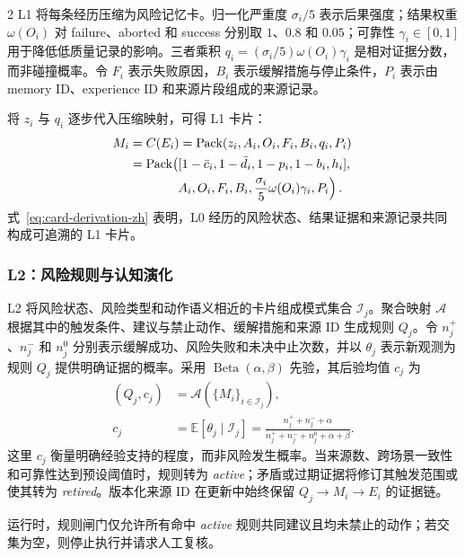 \documentclass[10pt]{article}
\begin{document}
\begin{multicols}{2}
L1 将每条经历压缩为风险记忆卡。归一化严重度 $\sigma_i/5$ 表示后果强度；结果权重 $\omega(O_i)$ 对 failure、aborted 和 success 分别取 $1$、$0.8$ 和 $0.05$；可靠性 $\gamma_i\in[0,1]$ 用于降低低质量记录的影响。三者乘积 $q_i=(\sigma_i/5)\omega(O_i)\gamma_i$ 是相对证据分数，而非碰撞概率。令 $F_i$ 表示失败原因，$B_i$ 表示缓解措施与停止条件，$P_i$ 表示由 memory ID、experience ID 和来源片段组成的来源记录。

将 $z_i$ 与 $q_i$ 逐步代入压缩映射，可得 L1 卡片：
\begin{equation}
\begin{aligned}
M_i&=C(E_i)=\operatorname{Pack}(z_i,A_i,O_i,F_i,B_i,q_i,P_i)\\
&=\operatorname{Pack}\!\left([1-\bar c_i,1-\bar d_i,1-p_i,1-b_i,h_i],\right.\\
&\hspace{3.6em}\left.A_i,O_i,F_i,B_i,
\frac{\sigma_i}{5}\omega(O_i)\gamma_i,P_i\right).
\end{aligned}
\label{eq:card-derivation-zh}
\end{equation}
式~\eqref{eq:card-derivation-zh} 表明，L0 经历的风险状态、结果证据和来源记录共同构成可追溯的 L1 卡片。

\subsubsection{L2：风险规则与认知演化}

L2 将风险状态、风险类型和动作语义相近的卡片组成模式集合 $\mathcal{I}_j$。聚合映射 $\mathcal{A}$ 根据其中的触发条件、建议与禁止动作、缓解措施和来源 ID 生成规则 $Q_j$。令 $n_j^+$、$n_j^-$ 和 $n_j^0$ 分别表示缓解成功、风险失败和未决中止次数，并以 $\theta_j$ 表示新观测为规则 $Q_j$ 提供明确证据的概率。采用 $\operatorname{Beta}(\alpha,\beta)$ 先验，其后验均值 $c_j$ 为
\begin{equation}
\begin{aligned}
(Q_j,c_j)&=\mathcal{A}(\{M_i\}_{i\in\mathcal{I}_j}),\\
c_j&=\mathbb{E}[\theta_j\mid\mathcal{I}_j]
=\frac{n_j^++n_j^-+\alpha}
{n_j^++n_j^-+n_j^0+\alpha+\beta}.
\end{aligned}
\label{eq:rule-zh}
\end{equation}
这里 $c_j$ 衡量明确经验支持的程度，而非风险发生概率。当来源数、跨场景一致性和可靠性达到预设阈值时，规则转为 \textit{active}；矛盾或过期证据将修订其触发范围或使其转为 \textit{retired}。版本化来源 ID 在更新中始终保留 $Q_j\rightarrow M_i\rightarrow E_i$ 的证据链。

运行时，规则闸门仅允许所有命中 \textit{active} 规则共同建议且均未禁止的动作；若交集为空，则停止执行并请求人工复核。


\end{multicols}
\end{document}
